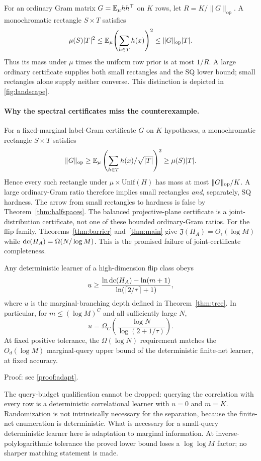 For an ordinary Gram matrix $G=\mathbb E_\mu hh^\top$ on $K$ rows, let $R=K/\|G\|_{\mathrm{op}}$. A monochromatic rectangle $S\times T$ satisfies
\[
 \mu(S)|T|^2\le\mathbb E_\mu\!\left(\sum_{h\in T}h(x)\right)^2
 \le\|G\|_{\mathrm{op}}|T|.
\]
Thus its mass under $\mu$ times the uniform row prior is at most $1/R$. A large ordinary certificate supplies both small rectangles and the SQ lower bound; small rectangles alone supply neither converse. This distinction is depicted in \cref{fig:landscape}.



\paragraph{Why the spectral certificates miss the counterexample.}
For a fixed-marginal label-Gram certificate $G$ on $K$ hypotheses, a monochromatic rectangle $S\times T$ satisfies
\[
 \|G\|_{\rm op}\ge\mathbb E_\mu\left(\sum_{h\in T}h(x)/\sqrt{|T|}\right)^2
 \ge\mu(S)|T|.
\]
Hence every such rectangle under $\mu\times\mathrm{Unif}(H)$ has mass at most $\|G\|_{\rm op}/K$. A large ordinary-Gram ratio therefore implies small rectangles \emph{and}, separately, SQ hardness. The arrow from small rectangles to hardness is false by Theorem~\ref{thm:halfspaces}. The balanced projective-plane certificate is a joint-distribution certificate, not one of these bounded ordinary-Gram ratios. For the flip family, Theorems~\ref{thm:barrier} and~\ref{thm:main} give $\mathfrak J(H_A)=O_\epsilon(\log M)$ while $\operatorname{dc}(H_A)=\Omega(N/\log M)$. This is the promised failure of joint-certificate completeness.


\begin{theorem}\label{thm:adapt}
Any deterministic learner of a high-dimension flip class obeys
\[
 u\ge\frac{\ln\operatorname{dc}(H_A)-\ln(m+1)}
 {\ln(\lceil2/\tau\rceil+1)},
\]
where $u$ is the marginal-branching depth defined in Theorem~\ref{thm:tree}. In particular, for $m\le(\log M)^C$ and all sufficiently large $N$,
\[
 u=\Omega_C\!\left(\frac{\log N}{\log(2+1/\tau)}\right).
\]
At fixed positive tolerance, the $\Omega(\log N)$ requirement matches the $O_d(\log M)$ marginal-query upper bound of the deterministic finite-net learner, at fixed accuracy.
\end{theorem}

\noindent Proof: see \cref{proof:adapt}.\par


The query-budget qualification cannot be dropped: querying the correlation with every row is a deterministic correlational learner with $u=0$ and $m=K$. Randomization is not intrinsically necessary for the separation, because the finite-net enumeration is deterministic. What is necessary for a small-query deterministic learner here is adaptation to marginal information. At inverse-polylogarithmic tolerance the proved lower bound loses a $\log\log M$ factor; no sharper matching statement is made.

